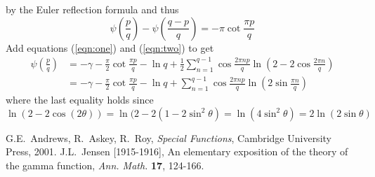 \documentclass[12pt]{article}
\begin{document}
by the Euler reflection formula and thus
\begin{equation}\label{eqn:two}\psi\left(\frac{p}{q}\right)-\psi\left(\frac{q-p}{q}\right)=-\pi\cot \frac{\pi p}{q}\end{equation}
Add equations (\ref{eqn:one}) and (\ref{eqn:two}) to get
\begin{align*}\psi\left(\frac{p}{q}\right)&=-\gamma-\frac{\pi}{2}\cot\frac{\pi p}{q}-\ln q+\frac{1}{2}\sum_{n=1}^{q-1}\cos\frac{2\pi n p}{q}\ln\left(2-2\cos\frac{2\pi n}{q}\right)\\
&=-\gamma-\frac{\pi}{2}\cot\frac{\pi p}{q}-\ln q+\sum_{n=1}^{q-1}\cos\frac{2\pi n p}{q}\ln\left(2\sin\frac{\pi n}{q}\right)
\end{align*}
where the last equality holds since
\[\ln(2-2\cos (2\theta))=\ln(2-2(1-2\sin^2\theta)=\ln(4\sin^2\theta)=2\ln(2\sin\theta)\]


\begin{thebibliography}{10}
G.E.~Andrews, R.~Askey, R.~Roy, \emph{Special Functions}, Cambridge University Press, 2001.
J.L.~Jensen [1915-1916], An elementary exposition of the theory of the gamma function, \emph{Ann. Math.} \textbf{17}, 124-166.
\end{thebibliography}

\end{document}
